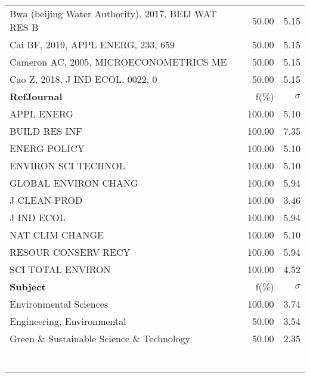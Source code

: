 \documentclass[a4paper,11pt]{report}
\begin{document}
\begin{landscape}
\begin{table}[!ht]
{\begin{tabular}{|p{8cm} r r|}
Bwa (beijing Water Authority), 2017, BEIJ WAT RES B & 50.00 & 5.15\\
Cai BF, 2019, APPL ENERG, 233, 659 & 50.00 & 5.15\\
Cameron AC, 2005, MICROECONOMETRICS ME & 50.00 & 5.15\\
Cao Z, 2018, J IND ECOL, 0022, 0 & 50.00 & 5.15\\
\hline
{\bf RefJournal }& f(\%) & $\sigma$\\
\hline
APPL ENERG & 100.00 & 5.10\\
BUILD RES INF & 100.00 & 7.35\\
ENERG POLICY & 100.00 & 5.10\\
ENVIRON SCI TECHNOL & 100.00 & 5.10\\
GLOBAL ENVIRON CHANG & 100.00 & 5.94\\
J CLEAN PROD & 100.00 & 3.46\\
J IND ECOL & 100.00 & 5.94\\
NAT CLIM CHANGE & 100.00 & 5.10\\
RESOUR CONSERV RECY & 100.00 & 5.94\\
SCI TOTAL ENVIRON & 100.00 & 4.52\\
\hline
{\bf Subject }& f(\%) & $\sigma$\\
\hline
Environmental Sciences & 100.00 & 3.74\\
Engineering, Environmental & 50.00 & 3.54\\
Green \& Sustainable Science \& Technology & 50.00 & 2.35\\
 &  & \\
 &  & \\
 &  & \\
 &  & \\
 &  & \\
 &  & \\
 &  & \\
\hline
\end{tabular}
}
\end{table}

\clearpage


\end{landscape}
\end{document}
